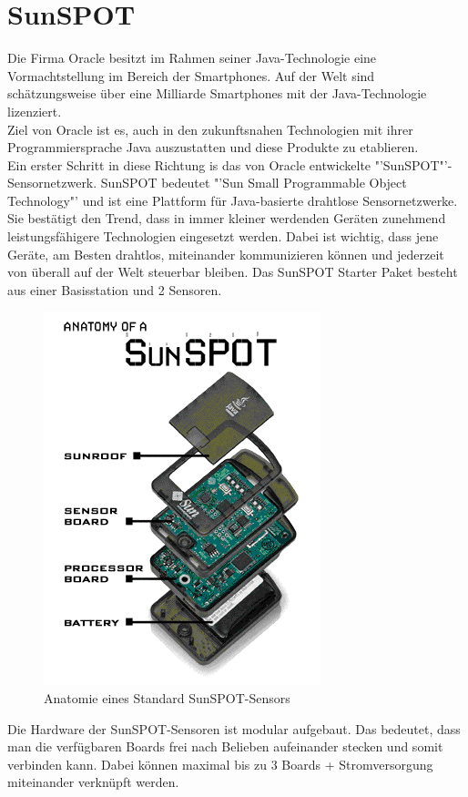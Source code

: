 \section{SunSPOT}\label{s:Sunspot}

Die Firma Oracle besitzt im Rahmen seiner Java-Technologie eine Vormachtstellung im Bereich der Smartphones.
Auf der Welt sind schätzungsweise über eine Milliarde Smartphones mit der Java-Technologie lizenziert. \cite{d:horan} \\ Ziel von Oracle ist es, auch in den zukunftsnahen Technologien mit ihrer Programmiersprache Java auszustatten und diese Produkte zu etablieren.\\

Ein erster Schritt in diese Richtung is das von Oracle entwickelte "'SunSPOT"'-Sensornetzwerk. SunSPOT bedeutet "'Sun Small Programmable Object Technology"' und ist eine Plattform für Java-basierte drahtlose Sensornetzwerke. Sie bestätigt den Trend, dass in immer kleiner werdenden Geräten zunehmend leistungsfähigere Technologien eingesetzt werden. Dabei ist wichtig, dass jene Geräte, am Besten drahtlos, miteinander kommunizieren können und jederzeit von überall auf der Welt steuerbar bleiben. Das SunSPOT Starter Paket besteht aus einer Basisstation und 2 Sensoren. \\

\begin{figure}[H] 
	\centering
	\includegraphics[scale=0.5]{Bilder/spotanatomy}
	\caption{Anatomie eines Standard SunSPOT-Sensors\cite{i:spotaufbau}}
	\label{f:spotaufbau}
\end{figure}

Die Hardware der SunSPOT-Sensoren ist modular aufgebaut. Das bedeutet, dass man die verfügbaren Boards frei nach Belieben aufeinander stecken und somit verbinden kann. Dabei können maximal bis zu 3 Boards + Stromversorgung miteinander verknüpft werden. \cite{d:horan} \\

